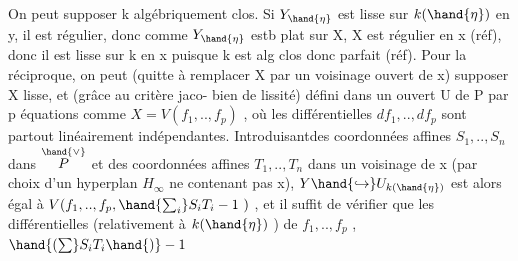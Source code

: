 On peut supposer k algébriquement clos. Si $Y_{\hand{\eta}}$ est lisse sur $k(\hand{\eta})$
en y, il est régulier, donc comme $Y_{\hand{\eta}}$ estb plat sur X, X est régulier
en x (réf), donc il est lisse sur k en x puisque k est alg clos donc
parfait (réf). Pour la réciproque, on peut (quitte à remplacer X par
un voisinage ouvert de x) supposer X lisse, et (grâce au critère jaco-%
bien de lissité) défini dans un ouvert U de P par p équations
comme $X=V(f_1,..,f_p)$ , où les différentielles $df_1,..,df_p$ sont
partout linéairement indépendantes. Introduisantdes coordonnées affines
$S_1,..,S_n$ dans $\overset{\hand{\vee}}{P}$ et des coordonnées affines $T_1,..,T_n$ dans un voisinage
de x (par choix d'un hyperplan $H_\infty$ ne contenant pas x), $Y\hand{\hookrightarrow} U_{k(\hand{\eta})}$ est
alors égal à $V(f_1,..,f_p,\hand{\sum_i}S_iT_i-1\ )$ , et il suffit de vérifier que
les différentielles (relativement à $k(\hand{\eta})$ ) de $f_1,..,f_p$ ,$\hand{(\sum}S_iT_i\hand{)}-1$

